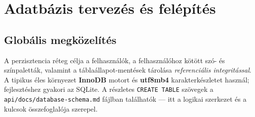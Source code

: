 \chapter{Adatbázis tervezés és felépítés}

\section{Globális megközelítés}
A perzisztencia réteg célja a felhasználók, a felhasználóhoz kötött szó- és színpaletták, valamint a táblaállapot-mentések tárolása \emph{referenciális integritással}. A tipikus éles környezet \textbf{InnoDB} motort és \textbf{utf8mb4} karakterkészletet használ; fejlesztéshez gyakori az SQLite. A részletes \texttt{CREATE TABLE} szövegek a \texttt{api/docs/database-schema.md} fájlban találhatók — itt a logikai szerkezet és a kulcsok összefoglalója szerepel.

